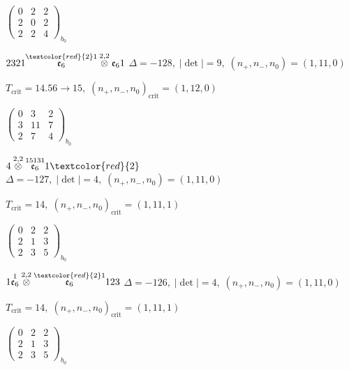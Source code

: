 \documentclass[10pt]{article}
\begin{document}
\hspace{2em}$\left(\begin{smallmatrix}0 & 2 & 2 \\ 2 & 0 & 2 \\ 2 & 2 & 4\end{smallmatrix}\right)_{\!b_0}$

\smallskip

$2321\overset{\textcolor{red}{2}1}{\mathfrak{e}_6}\overset{2,2}{\otimes}\mathfrak{e}_61$ \quad $\Delta=-128,\; |\det|=9,\; (n_+,n_-,n_0)=(1,11,0)$

\hspace{1em}$T_{\text{crit}}=14.56 \to 15,\; (n_+,n_-,n_0)_{\text{crit}}=(1,12,0)$

\hspace{2em}$\left(\begin{smallmatrix}0 & 3 & 2 \\ 3 & 11 & 7 \\ 2 & 7 & 4\end{smallmatrix}\right)_{\!b_0}$

\smallskip

$4\overset{2,2}{\otimes}\overset{15131}{\mathfrak{e}_6}1\textcolor{red}{2}$ \quad $\Delta=-127,\; |\det|=4,\; (n_+,n_-,n_0)=(1,11,0)$

\hspace{1em}$T_{\text{crit}}=14,\; (n_+,n_-,n_0)_{\text{crit}}=(1,11,1)$

\hspace{2em}$\left(\begin{smallmatrix}0 & 2 & 2 \\ 2 & 1 & 3 \\ 2 & 3 & 5\end{smallmatrix}\right)_{\!b_0}$

\smallskip

$1\overset{1}{\mathfrak{e}_6}\overset{2,2}{\otimes}\overset{\textcolor{red}{2}1}{\mathfrak{e}_6}123$ \quad $\Delta=-126,\; |\det|=4,\; (n_+,n_-,n_0)=(1,11,0)$

\hspace{1em}$T_{\text{crit}}=14,\; (n_+,n_-,n_0)_{\text{crit}}=(1,11,1)$

\hspace{2em}$\left(\begin{smallmatrix}0 & 2 & 2 \\ 2 & 1 & 3 \\ 2 & 3 & 5\end{smallmatrix}\right)_{\!b_0}$
\end{document}
